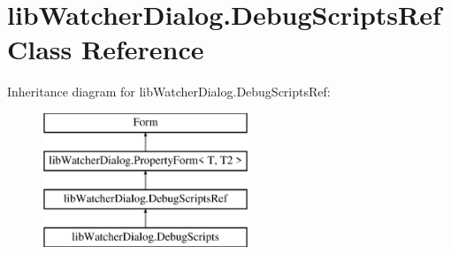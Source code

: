 \hypertarget{classlib_watcher_dialog_1_1_debug_scripts_ref}{\section{lib\+Watcher\+Dialog.\+Debug\+Scripts\+Ref Class Reference}
\label{classlib_watcher_dialog_1_1_debug_scripts_ref}
}
Inheritance diagram for lib\+Watcher\+Dialog.\+Debug\+Scripts\+Ref\+:\begin{figure}[H]
\begin{center}
\leavevmode
\includegraphics[height=4.000000cm]{classlib_watcher_dialog_1_1_debug_scripts_ref}
\end{center}
\end{figure}
